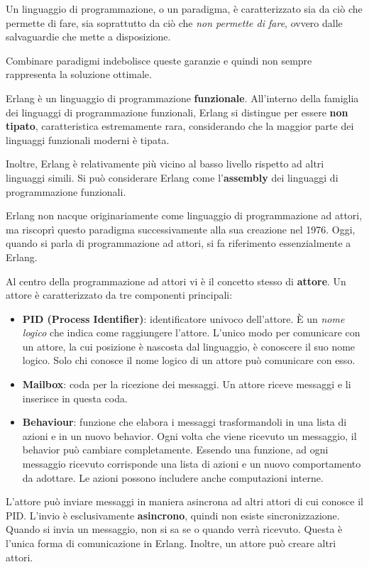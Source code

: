 \documentclass{article}
\begin{document}
Un linguaggio di programmazione, o un paradigma, è caratterizzato sia da ciò che permette di fare, sia soprattutto da ciò che \textit{non permette di fare}, ovvero dalle salvaguardie che mette a disposizione.

Combinare paradigmi indebolisce queste garanzie e quindi non sempre rappresenta la soluzione ottimale.

Erlang è un linguaggio di programmazione \textbf{funzionale}. All'interno della famiglia dei linguaggi di programmazione funzionali, Erlang si distingue per essere \textbf{non tipato}, caratteristica estremamente rara, considerando che la maggior parte dei linguaggi funzionali moderni è tipata.

Inoltre, Erlang è relativamente più vicino al basso livello rispetto ad altri linguaggi simili. Si può considerare Erlang come l'\textbf{assembly} dei linguaggi di programmazione funzionali.

Erlang non nacque originariamente come linguaggio di programmazione ad attori, ma riscoprì questo paradigma successivamente alla sua creazione nel 1976. Oggi, quando si parla di programmazione ad attori, si fa riferimento essenzialmente a Erlang.

Al centro della programmazione ad attori vi è il concetto stesso di \textbf{attore}. Un attore è caratterizzato da tre componenti principali:
\begin{itemize}
    \item \textbf{PID (Process Identifier)}: identificatore univoco dell'attore. È un \textit{nome logico} che indica come raggiungere l'attore. L'unico modo per comunicare con un attore, la cui posizione è nascosta dal linguaggio, è conoscere il suo nome logico. Solo chi conosce il nome logico di un attore può comunicare con esso.
    \item \textbf{Mailbox}: coda per la ricezione dei messaggi. Un attore riceve messaggi e li inserisce in questa coda.
    \item \textbf{Behaviour}: funzione che elabora i messaggi trasformandoli in una lista di azioni e in un nuovo behavior. Ogni volta che viene ricevuto un messaggio, il behavior può cambiare completamente. Essendo una funzione, ad ogni messaggio ricevuto corrisponde una lista di azioni e un nuovo comportamento da adottare. Le azioni possono includere anche computazioni interne.
\end{itemize}
L'attore può inviare messaggi in maniera asincrona ad altri attori di cui conosce il PID. L'invio è esclusivamente \textbf{asincrono}, quindi non esiste sincronizzazione. Quando si invia un messaggio, non si sa se o quando verrà ricevuto. Questa è l'unica forma di comunicazione in Erlang. Inoltre, un attore può creare altri attori.
\end{document}
